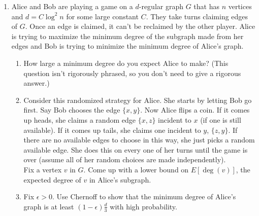 \documentclass[11pt,letterpaper]{report}
\begin{document}
\begin{enumerate}
	\item Alice and Bob are playing a game on a $d$-regular graph $G$ that has $n$ vertices and $d = C\log^2n$ for some large constant $C$. They take turns claiming edges of $G$. Once an edge is claimed, it can't be reclaimed by the other player. Alice is trying to maximize the minimum degree of the subgraph made from her edges and Bob is trying to minimize the minimum degree of Alice's graph.
	\begin{enumerate}
		\item How large a minimum degree do you expect Alice to make? (This question isn't rigorously phrased, so you don't need to give a rigorous answer.)

		\vfill

		\item Consider this randomized strategy for Alice. She starts by letting Bob go first. Say Bob chooses the edge $\{x,y\}$. Now Alice flips a coin. If it comes up heads, she claims a random edge $\{x, z\}$ incident to $x$ (if one is still available). If it comes up tails, she claims one incident to $y$, $\{z, y\}$. If there are no available edges to choose in this way, she just picks a random available edge. She does this on every one of her turns until the game is over (assume all of her random choices are made independently).\\

		Fix a vertex $v$ in $G$. Come up with a lower bound on $E[\deg(v)]$, the expected degree of $v$ in Alice's subgraph.

		\vfill 

		\item Fix $\epsilon>0$. Use Chernoff to show that the minimum degree of Alice's graph is at least $(1-\epsilon)\frac{d}{3}$ with high probability.
		\vfill
	\end{enumerate}

\end{enumerate}
\end{document}

